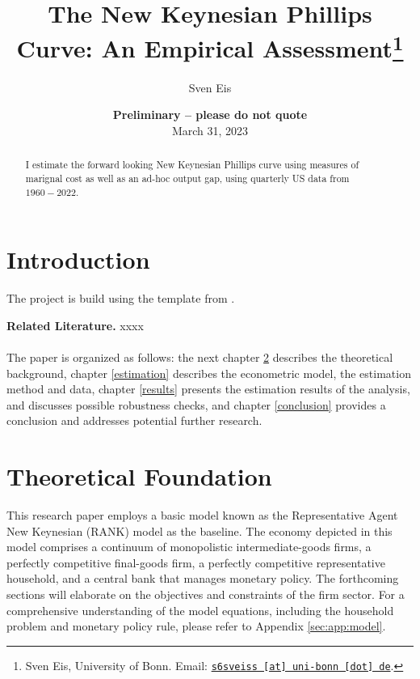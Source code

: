 \documentclass[11pt, a4paper, leqno]{article}
\begin{document}
\title{The New Keynesian Phillips Curve: An Empirical Assessment\thanks{Sven Eis, University of Bonn. Email: \href{mailto:s6sveiss@uni-bonn.de}{\nolinkurl{s6sveiss [at] uni-bonn [dot] de}}.}}

\author{Sven Eis}

\date{
    {\bf Preliminary -- please do not quote}
    \\[1ex]
    March 31, 2023
}

\maketitle


\begin{abstract}
    I estimate the forward looking New Keynesian Phillips curve using measures of marignal cost as well as an ad-hoc output gap, using quarterly US data from $1960-2022$.
\end{abstract}

\clearpage


\section{Introduction} %
\label{sec:introduction}

The project is build using the template from \citet{GaudeckerEconProjectTemplates}.

\textbf{Related Literature.} xxxx\\
\\
The paper is organized as follows: the next chapter \ref{theory} describes the theoretical background, chapter \ref{estimation} describes the econometric model, the estimation method and data, chapter \ref{results} presents the estimation results of the analysis, and discusses possible robustness checks, and chapter \ref{conclusion} provides a conclusion and addresses potential further research.



\section{Theoretical Foundation} \label{theory}
This research paper employs a basic model known as the Representative Agent New Keynesian (RANK) model as the baseline. The economy depicted in this model comprises a continuum of monopolistic intermediate-goods firms, a perfectly competitive final-goods firm, a perfectly competitive representative household, and a central bank that manages monetary policy. The forthcoming sections will elaborate on the objectives and constraints of the firm sector. For a comprehensive understanding of the model equations, including the household problem and monetary policy rule, please refer to Appendix \ref{sec:app:model}.
\end{document}
